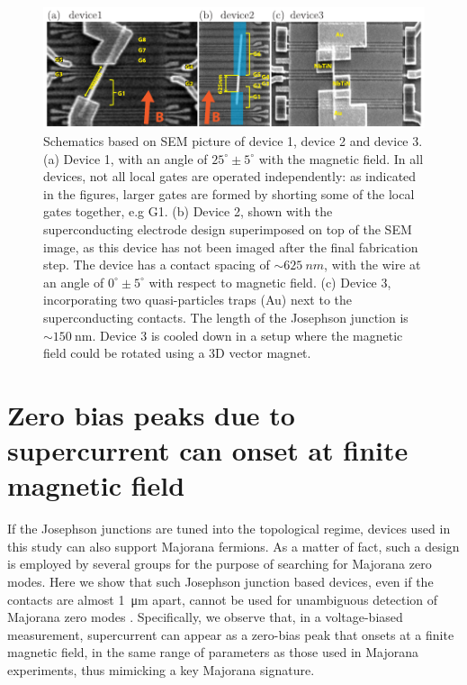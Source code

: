 \documentclass[english, aps,prb,showpacs,preprintnumber,amsmath,amssymb,superscriptaddress,reprint]{revtex4-1}
\begin{document}
\begin{figure}[!h]
\centering
\includegraphics[width=\textwidth]{figures/sup_fig4.pdf}
\caption{Schematics based on SEM picture of device 1, device 2 and device 3. 
(a) Device 1, with an angle of $25^{\circ} \pm 5^{\circ}$ with the magnetic field. 
In all devices, not all local gates are operated independently: as indicated in the figures, larger gates are formed by shorting some of the local gates together, e.g G1. 
(b) Device 2, shown with the superconducting electrode design superimposed on top of the SEM image, as this device has not been imaged after the final fabrication step. 
The device has a contact spacing of $\sim \SI{625}{nm}$, with the wire at an angle of $0^\circ \pm 5^\circ$ with respect to magnetic field. 
(c) Device 3, incorporating two quasi-particles traps (Au) next to the superconducting contacts. 
The length of the Josephson junction is $\sim \SI{150}{\nano \meter}$. 
Device 3 is cooled down in a setup where the magnetic field could be rotated using a 3D vector magnet.}
\label{fig: SEM_D1D3}
\end{figure}

\newpage

\section{Zero bias peaks due to supercurrent can onset at finite magnetic field}

If the Josephson junctions are tuned into the topological regime, devices used in this study can also support Majorana fermions. 
As a matter of fact, such a design is employed by several groups for the purpose of searching for Majorana zero modes. 
Here we show that such Josephson junction based devices, even if the contacts are almost \SI{1}{\micro \meter} apart, cannot be used for unambiguous detection of Majorana zero modes \cite{deng2012ZBP, deng2014parity, Harlingen2013ZBP}. 
Specifically, we observe that, in a voltage-biased measurement, supercurrent can appear as a zero-bias peak that onsets at a finite magnetic field, in the same range of parameters as those used in Majorana experiments, thus mimicking a key Majorana signature.
\end{document}
